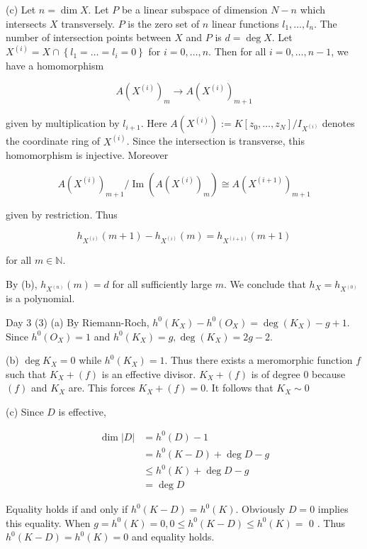 \documentclass[10pt]{article}
\begin{document}
(c) Let $n=\operatorname{dim} X$. Let $P$ be a linear subspace of dimension $N-n$ which intersects $X$ transversely. $P$ is the zero set of $n$ linear functions $l_{1}, \ldots, l_{n}$. The number of intersection points between $X$ and $P$ is $d=\operatorname{deg} X$. Let $X^{(i)}=X \cap\left\{l_{1}=\ldots=l_{i}=0\right\}$ for $i=0, \ldots, n$. Then for all $i=0, \ldots, n-1$, we have a homomorphism

$$
A\left(X^{(i)}\right)_{m} \rightarrow A\left(X^{(i)}\right)_{m+1}
$$

given by multiplication by $l_{i+1}$. Here $A\left(X^{(i)}\right):=K\left[z_{0}, \ldots, z_{N}\right] / I_{X^{(i)}}$ denotes the coordinate ring of $X^{(i)}$. Since the intersection is transverse, this homomorphism is injective. Moreover

$$
A\left(X^{(i)}\right)_{m+1} / \operatorname{Im}\left(A\left(X^{(i)}\right)_{m}\right) \cong A\left(X^{(i+1)}\right)_{m+1}
$$

given by restriction. Thus

$$
h_{X^{(i)}}(m+1)-h_{X^{(i)}}(m)=h_{X^{(i+1)}}(m+1)
$$

for all $m \in \mathbb{N}$.

By (b), $h_{X^{(n)}}(m)=d$ for all sufficiently large $m$. We conclude that $h_{X}=h_{X^{(0)}}$ is a polynomial.

Day 3 (3) (a) By Riemann-Roch, $h^{0}\left(K_{X}\right)-h^{0}\left(O_{X}\right)=\operatorname{deg}\left(K_{X}\right)-g+1$. Since $h^{0}\left(O_{X}\right)=1$ and $h^{0}\left(K_{X}\right)=g, \operatorname{deg}\left(K_{X}\right)=2 g-2$.

(b) $\operatorname{deg} K_{X}=0$ while $h^{0}\left(K_{X}\right)=1$. Thus there exists a meromorphic function $f$ such that $K_{X}+(f)$ is an effective divisor. $K_{X}+(f)$ is of degree 0 because $(f)$ and $K_{X}$ are. This forces $K_{X}+(f)=0$. It follows that $K_{X} \sim 0$

(c) Since $D$ is effective,

$$
\begin{aligned}
\operatorname{dim}|D| & =h^{0}(D)-1 \\
& =h^{0}(K-D)+\operatorname{deg} D-g \\
& \leq h^{0}(K)+\operatorname{deg} D-g \\
& =\operatorname{deg} D
\end{aligned}
$$

Equality holds if and only if $h^{0}(K-D)=h^{0}(K)$. Obviously $D=0$ implies this equality. When $g=h^{0}(K)=0,0 \leq h^{0}(K-D) \leq h^{0}(K)=$ 0 . Thus $h^{0}(K-D)=h^{0}(K)=0$ and equality holds.
\end{document}
